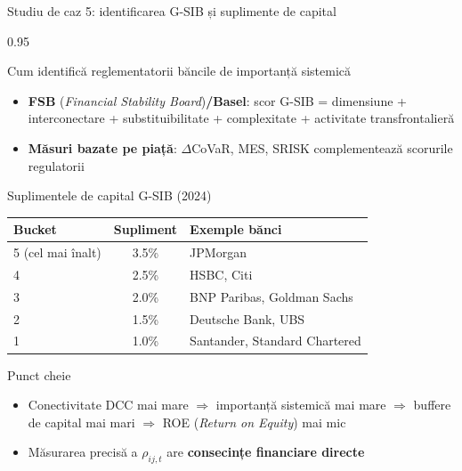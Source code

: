 \documentclass[9pt, aspectratio=169, t]{beamer}
\begin{document}
\begin{frame}{Studiu de caz 5: identificarea G-SIB și suplimente de capital}
    \begin{cminipage}{0.95\textwidth}
    \vspace{-4mm}
    {\scriptsize
    \begin{block}{Cum identifică reglementatorii băncile de importanță sistemică}
        \begin{itemize}\setlength{\itemsep}{0pt}
            \item \textbf{FSB} (\textit{Financial Stability Board})\textbf{/Basel}: scor G-SIB = dimensiune + interconectare + substituibilitate + complexitate + activitate transfrontalieră
            \item \textbf{Măsuri bazate pe piață}: $\Delta$CoVaR, MES, SRISK complementează scorurile regulatorii
        \end{itemize}
    \end{block}
    \vspace{-2mm}
    \begin{block}{Suplimentele de capital G-SIB (2024)}
        {\small
        \begin{center}
        \begin{tabular}{l|c|l}
            \hline
            \textbf{Bucket} & \textbf{Supliment} & \textbf{Exemple bănci} \\
            \hline
            5 (cel mai înalt)   & 3.5\% & JPMorgan \\
            4                   & 2.5\% & HSBC, Citi \\
            3                   & 2.0\% & BNP Paribas, Goldman Sachs \\
            2                   & 1.5\% & Deutsche Bank, UBS \\
            1                   & 1.0\% & Santander, Standard Chartered \\
            \hline
        \end{tabular}
        \end{center}
        }
    \end{block}
    \vspace{-2mm}
    \begin{alertblock}{Punct cheie}
        \begin{itemize}\setlength{\itemsep}{0pt}
            \item Conectivitate DCC mai mare $\Rightarrow$ importanță sistemică mai mare $\Rightarrow$ buffere de capital mai mari $\Rightarrow$ ROE (\textit{Return on Equity}) mai mic
            \item Măsurarea precisă a $\rho_{ij,t}$ are \textbf{consecințe financiare directe}
        \end{itemize}
    \end{alertblock}
    }
    \end{cminipage}
\end{frame}
\end{document}
